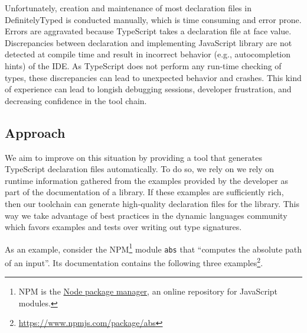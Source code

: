 \documentclass[sigconf]{acmart}
\begin{document}
Unfortunately, creation and maintenance of most declaration
files in DefinitelyTyped is conducted manually,
which is time consuming and  error prone. Errors are aggravated because TypeScript takes a
declaration file at face value. Discrepancies between declaration and
implementing JavaScript library are not detected at 
compile time and result in incorrect behavior (e.g., autocompletion
hints) of the IDE. 
As TypeScript does not perform any run-time 
checking of types, these  discrepancies can lead to unexpected 
behavior and crashes. This kind of experience can lead to longish debugging sessions,  developer
frustration, and decreasing confidence in the tool chain.

\subsection{Approach}
\label{sec:approach}

We aim to improve on this situation by providing a tool that generates
TypeScript declaration files automatically. To do so, we rely on we rely on runtime information
gathered from the examples provided
by the developer as part of the documentation of a library. If these
examples are sufficiently rich, then our toolchain can generate
high-quality declaration files for the library. This way we take
advantage of 
best practices in the dynamic languages community which favors
examples and tests over writing out type signatures.

As an example, consider the NPM\footnote{NPM is the \href{https://www.npmjs.com/}{Node package
  manager}, an online repository for JavaScript modules.} module
\texttt{abs} that
``computes the absolute path of an input''. Its documentation contains
the following three
examples\footnote{\url{https://www.npmjs.com/package/abs}}. 
\end{document}
